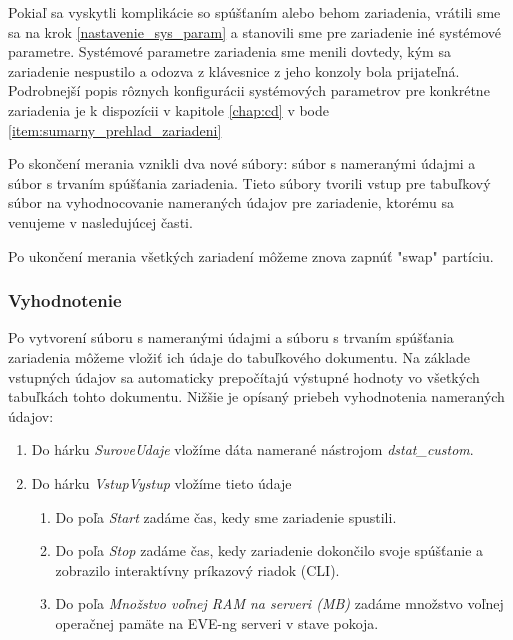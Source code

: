 Pokiaľ sa vyskytli komplikácie so spúšťaním alebo behom zariadenia, vrátili sme sa na krok \ref{nastavenie_sys_param} a stanovili sme pre zariadenie iné systémové parametre. Systémové parametre zariadenia sme menili dovtedy, kým sa zariadenie nespustilo a odozva z klávesnice z jeho konzoly bola prijateľná. Podrobnejší popis rôznych konfigurácii systémových parametrov pre konkrétne zariadenia je k dispozícii v kapitole \ref{chap:cd} v bode \ref{item:sumarny_prehlad_zariadeni}

Po skončení merania vznikli dva nové súbory: súbor s nameranými údajmi a súbor s trvaním spúšťania zariadenia. Tieto súbory tvorili vstup pre tabuľkový súbor na vyhodnocovanie nameraných údajov pre zariadenie, ktorému sa venujeme v nasledujúcej časti.

Po ukončení merania všetkých zariadení môžeme znova zapnúť "swap" partíciu.





\subsubsection{Vyhodnotenie}
\label{chap:testovanie_zariadeni_benchmark_vyhodnotenie}

Po vytvorení súboru s nameranými údajmi a súboru s trvaním spúšťania zariadenia môžeme vložiť ich údaje do tabuľkového dokumentu. Na základe vstupných údajov sa automaticky prepočítajú výstupné hodnoty vo všetkých tabuľkách tohto dokumentu. Nižšie je opísaný priebeh vyhodnotenia nameraných údajov:

\begin{enumerate}[noitemsep]
    \item Do hárku \emph{SuroveUdaje} vložíme dáta namerané nástrojom \emph{dstat\_custom}.
    \item Do hárku \emph{VstupVystup} vložíme tieto údaje
    \begin{enumerate}[noitemsep]
        \item Do poľa \emph{Start} zadáme čas, kedy sme zariadenie spustili.
        \item Do poľa \emph{Stop} zadáme čas, kedy zariadenie dokončilo svoje spúšťanie a zobrazilo interaktívny príkazový riadok (CLI).
        \item Do poľa \emph{Množstvo voľnej RAM na serveri (MB)} zadáme množstvo voľnej operačnej pamäte na EVE-ng serveri v stave pokoja.
    \end{enumerate}
\end{enumerate}

